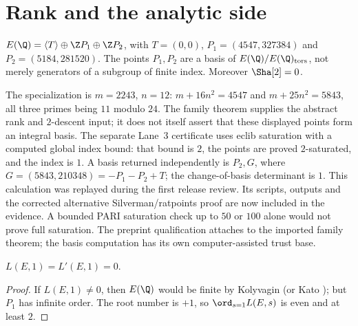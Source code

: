 \section{Rank and the analytic side}\label{sec:rank}

\begin{theorem}\label{thm:mw}
$E(\Q)=\langle T\rangle\oplus\Z P_1\oplus\Z P_2$, with $T=(0,0)$, $P_1=(4547,327384)$ and $P_2=(5184,281520)$. The points $P_1,P_2$ are a basis of $E(\Q)/E(\Q)_{\mathrm{tors}}$, not merely generators of a subgroup of finite index. Moreover $\Sha[2]=0$.
\end{theorem}
The specialization is $m=2243$, $n=12$: $m+16n^2=4547$ and $m+25n^2=5843$, all three primes being $11$ modulo $24$. The family theorem \cite[Thm.~1.2]{zywina} supplies the abstract rank and $2$-descent input; it does not itself assert that these displayed points form an integral basis. The separate Lane~3 certificate uses eclib saturation with a computed global index bound: that bound is $2$, the points are proved $2$-saturated, and the index is $1$. A basis returned independently is $P_2,G$, where $G=(5843,210348)=-P_1-P_2+T$; the change-of-basis determinant is $1$. This calculation was replayed during the first release review. Its scripts, outputs and the corrected alternative Silverman/ratpoints proof are now included in the evidence. A bounded PARI saturation check up to $50$ or $100$ alone would not prove full saturation. The preprint qualification attaches to the imported family theorem; the basis computation has its own computer-assisted trust base.

\begin{proposition}\label{prop:vanish}
$L(E,1)=L'(E,1)=0$.
\end{proposition}
\begin{proof}
If $L(E,1)\neq0$, then $E(\Q)$ would be finite by Kolyvagin \cite{kolyvagin} (or Kato \cite{kato}); but $P_1$ has infinite order. The root number is $+1$, so $\ord_{s=1}L(E,s)$ is even and at least $2$.
\end{proof}

